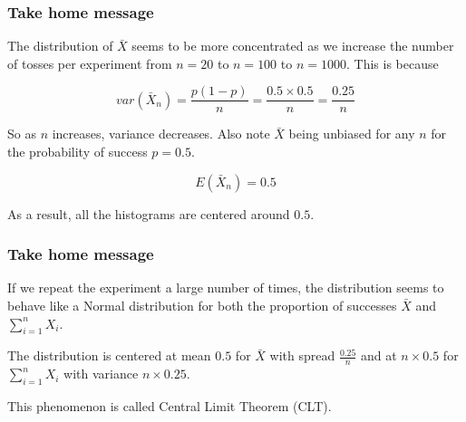 \documentclass{beamer}\usepackage[]{graphicx}\usepackage[]{color}
\begin{document}
\begin{frame}[fragile]
\frametitle{Take home message}

The distribution of $\bar{X}$ seems to be more concentrated as we increase the number of tosses per experiment from $n=20$ to $n=100$ to $n=1000$. This is because 

$$ var(\bar{X}_{n}) = \frac{p(1-p)}{n} = \frac{0.5 \times 0.5}{n} = \frac{0.25}{n} $$

So as $n$ increases, variance decreases. Also note $\bar{X}$ being unbiased for any $n$ for the probability of success $p=0.5$. 

$$ E(\bar{X}_{n}) = 0.5 $$

As a result, all the histograms are centered around $0.5$.

\end{frame}

\begin{frame}[fragile]
\frametitle{Take home message}

If we repeat the experiment a large number of times, the distribution seems to behave like a Normal distribution for both the proportion of successes $\bar{X}$ and $\sum_{i=1}^{n} X_i$. \pause \newline

The distribution is centered at mean $0.5$ for $\bar{X}$ with spread $\frac{0.25}{n}$ and at $n \times 0.5$ for $\sum_{i=1}^{n} X_i$ with variance $n \times 0.25$. \pause \newline

This phenomenon is called Central Limit Theorem (CLT). 

\end{frame}
\end{document}
